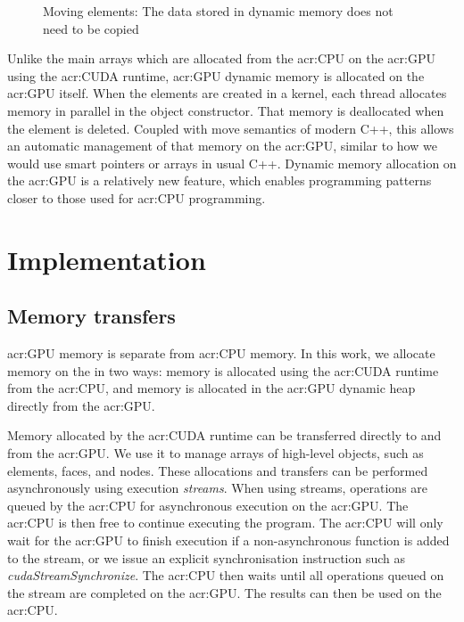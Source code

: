 \begin{figure}[H]
	\centering
	
	\caption{Moving elements: The data stored in dynamic memory does not need to be copied}\label{fig:moving_elements}
\end{figure}

Unlike the main arrays which are allocated from the \acrshort{acr:CPU} on the \acrshort{acr:GPU}
using the \acrshort{acr:CUDA} runtime, \acrshort{acr:GPU} dynamic memory is allocated on the
\acrshort{acr:GPU} itself. When the elements are created in a kernel, each thread allocates memory
in parallel in the object constructor. That memory is deallocated when the element is deleted.
Coupled with move semantics of modern C++, this allows an automatic management of that memory on the
\acrshort{acr:GPU}, similar to how we would use smart pointers or arrays in usual C++. Dynamic
memory allocation on the \acrshort{acr:GPU} is a relatively new feature, which enables programming
patterns closer to those used for \acrshort{acr:CPU} programming.

\section{Implementation}\label{section:graphics_processing_units:implementation}

\subsection{Memory transfers}\label{subsection:graphics_processing_units:implementation:memory}

\Acrshort{acr:GPU} memory is separate from \acrshort{acr:CPU} memory. In this work, we allocate
memory on the  in two ways: memory is allocated using the \acrshort{acr:CUDA}
runtime from the \acrshort{acr:CPU}, and memory is allocated in the \acrshort{acr:GPU} dynamic heap
directly from the \acrshort{acr:GPU}.

Memory allocated by the \acrshort{acr:CUDA} runtime can be transferred directly to and from the
\acrshort{acr:GPU}. We use it to manage arrays of high-level objects, such as elements, faces, and
nodes. These allocations and transfers can be performed asynchronously using execution
\textit{streams}. When using streams, operations are queued by the \acrshort{acr:CPU} for
asynchronous execution on the \acrshort{acr:GPU}. The \acrshort{acr:CPU} is then free to continue
executing the program. The \acrshort{acr:CPU} will only wait for the \acrshort{acr:GPU} to finish
execution if a non-asynchronous function is added to the stream, or we issue an explicit
synchronisation instruction such as \textit{cudaStreamSynchronize}. The \acrshort{acr:CPU} then
waits until all operations queued on the stream are completed on the \acrshort{acr:GPU}. The results
can then be used on the \acrshort{acr:CPU}.

